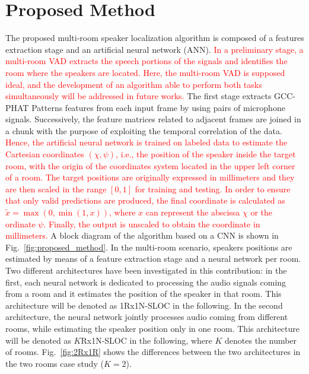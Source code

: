 \documentclass[review]{elsarticle}
\newcommand{\figref}[1]{Fig.~\ref{#1}}
\begin{document}
\section{Proposed Method}\label{sec:ALGO}
The proposed multi-room speaker localization algorithm is composed of a features extraction stage and an artificial neural network (ANN). \textcolor{red}{In a preliminary stage, a multi-room VAD \cite{ferronineural,vesperini2016deep} extracts the speech portions of the signals and identifies the room where the speakers are located. Here, the multi-room VAD is supposed ideal, and the development of an algorithm able to perform both tasks simultaneously will be addressed in future works.} The first stage extracts GCC-PHAT Patterns features from each input frame by using pairs of microphone signals. Successively, the feature matrices related to adjacent frames are joined in a chunk  with the purpose of exploiting the temporal correlation of the data. \textcolor{red}{Hence, the artificial neural network is trained on labeled data to estimate the Cartesian coordinates $\left ( \chi,\psi \right )$, i.e., the position of the speaker inside the target room, with the origin of the coordinates system located in the upper left corner of a room. The target positions are originally expressed in millimeters and they are then scaled in the range $[0,1]$ for training and testing. In order to ensure that only valid predictions are produced, the final coordinate is calculated as $\tilde{x} =\max(0, \min(1, x))$, where $x$ can represent the abscissa $\chi$ or the ordinate $\psi$. Finally, the output is unscaled to obtain the coordinate in millimeters.} A block diagram of the algorithm based on a CNN is shown in \figref{fig:proposed_method}.
In the multi-room scenario, speakers positions are estimated by means of a feature extraction stage and a neural network per room. Two different architectures have been investigated in this contribution: in the first, each neural network is dedicated to processing the audio signals coming from a room and it estimates the position of the speaker in that room. This architecture will be denoted as 1Rx1N-SLOC in the following. In the second architecture, the neural network jointly processes audio coming from different rooms, while estimating the speaker position only in one room. This architecture will be denoted as $K$Rx1N-SLOC in the following, where $K$ denotes the number of rooms. \figref{fig:2Rx1R} shows the differences between the two architectures in the two rooms case study ($K=2$).
\end{document}
